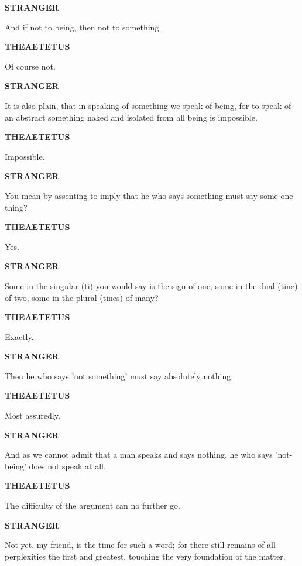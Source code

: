 \documentclass[11pt,letter]{article}
\begin{document}
\par \textbf{STRANGER}
\par   And if not to being, then not to something.

\par \textbf{THEAETETUS}
\par   Of course not.

\par \textbf{STRANGER}
\par   It is also plain, that in speaking of something we speak of being, for to speak of an abstract something naked and isolated from all being is impossible.

\par \textbf{THEAETETUS}
\par   Impossible.

\par \textbf{STRANGER}
\par   You mean by assenting to imply that he who says something must say some one thing?

\par \textbf{THEAETETUS}
\par   Yes.

\par \textbf{STRANGER}
\par   Some in the singular (ti) you would say is the sign of one, some in the dual (tine) of two, some in the plural (tines) of many?

\par \textbf{THEAETETUS}
\par   Exactly.

\par \textbf{STRANGER}
\par   Then he who says 'not something' must say absolutely nothing.

\par \textbf{THEAETETUS}
\par   Most assuredly.

\par \textbf{STRANGER}
\par   And as we cannot admit that a man speaks and says nothing, he who says 'not-being' does not speak at all.

\par \textbf{THEAETETUS}
\par   The difficulty of the argument can no further go.

\par \textbf{STRANGER}
\par   Not yet, my friend, is the time for such a word; for there still remains of all perplexities the first and greatest, touching the very foundation of the matter.
\end{document}
